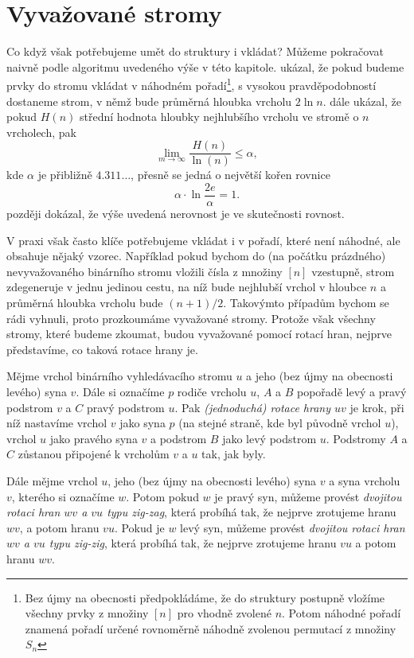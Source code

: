 \section{Vyvažované stromy}

Co když však potřebujeme umět do struktury i vkládat? Můžeme pokračovat naivně
podle algoritmu uvedeného výše v této kapitole. \citet{sortingsearching}
ukázal, že pokud budeme prvky do stromu vkládat v náhodném pořadí\footnote{Bez
újmy na obecnosti předpokládáme, že do struktury postupně vložíme všechny prvky
z množiny $[n]$ pro vhodně zvolené $n$. Potom náhodné pořadí znamená pořadí
určené rovnoměrně náhodně zvolenou permutací z množiny $S_n$}, s vysokou
pravděpodobností dostaneme strom, v němž bude průměrná hloubka vrcholu $2 \ln n$.
\citet{Robson} dále ukázal, že pokud $H(n)$ střední hodnota hloubky nejhlubšího 
vrcholu ve stromě o $n$ vrcholech, pak $$\lim_{m\rightarrow
\infty}\frac{H(n)}{\ln(n)}\leq\alpha,$$ kde $\alpha$ je přibližně
$4.311\dots$, přesně se jedná o největší kořen rovnice $$\alpha\cdot \ln
\frac{2e}{\alpha} = 1.$$ \citet{devroye} později dokázal, že výše uvedená
nerovnost je ve skutečnosti rovnost.

V praxi však často klíče potřebujeme vkládat i v pořadí, které není náhodné,
ale obsahuje nějaký vzorec. Například pokud bychom do (na počátku prázdného)
nevyvažovaného binárního stromu vložili čísla z množiny $[n]$ vzestupně, strom
zdegeneruje v jednu jedinou cestu, na níž bude nejhlubší vrchol v hloubce $n$ a
průměrná hloubka vrcholu bude $(n+1)/2$. Takovýmto případům bychom se rádi
vyhnuli, proto prozkoumáme vyvažované stromy. Protože však všechny stromy,
které budeme zkoumat, budou vyvažované pomocí rotací hran, nejprve představíme,
co taková rotace hrany je.

\begin{definice}
Mějme vrchol binárního vyhledávacího stromu $u$ a jeho (bez újmy na obecnosti levého) syna $v$. Dále si
označíme $p$ rodiče vrcholu $u$, $A$ a $B$ popořadě levý a pravý podstrom $v$ a
$C$ pravý podstrom $u$. Pak \emph{(jednoduchá) rotace hrany $uv$} je krok,
při níž nastavíme vrchol $v$ jako syna $p$ (na stejné straně, kde byl původně
vrchol $u$), vrchol $u$ jako pravého syna $v$ a podstrom $B$ jako levý podstrom
$u$. Podstromy $A$ a $C$ zůstanou připojené k vrcholům $v$ a $u$ tak, jak byly.

Dále mějme vrchol $u$, jeho (bez újmy na obecnosti levého) syna $v$ a syna
vrcholu $v$, kterého si označíme $w$. Potom pokud $w$ je pravý syn, můžeme
provést \emph{dvojitou rotaci hran $wv$ a $vu$ typu zig-zag}, která probíhá tak,
že nejprve zrotujeme hranu $wv$, a potom hranu $vu$. Pokud je $w$ levý syn,
můžeme provést \emph{dvojitou rotaci hran $wv$ a $vu$ typu zig-zig}, která
probíhá tak, že nejprve zrotujeme hranu $vu$ a potom hranu $wv$.
\end{definice}

